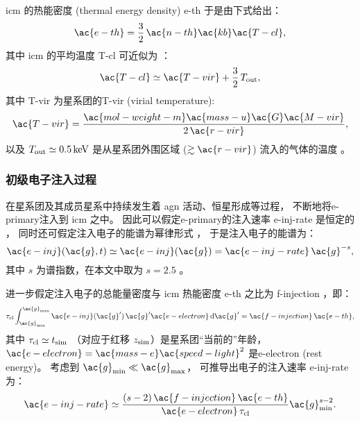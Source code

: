 \ac{icm} 的热能密度 (thermal energy density) \ac{e-th} 于是由下式给出：
\begin{equation}
  \label{eq:e-th}
  \ac{e-th} = \frac{3}{2} \,\ac{n-th} \ac{kb} \ac{T-cl} ,
\end{equation}
其中 \ac{icm} 的平均温度 \ac{T-cl} 可近似为 \cite{cavaliere1998}：
\begin{equation}
  \label{eq:t-icm}
  \ac{T-cl} \simeq \ac{T-vir} + \frac{3}{2} \,T_{\R{out}} ,
\end{equation}
其中 \ac{T-vir} 为星系团的\acl{T-vir} (virial temperature):
\begin{equation}
  \ac{T-vir} =
    \frac{\ac{mol-weight-m} \ac{mass-u} \ac{G} \ac{M-vir}}{2\,\ac{r-vir}} ,
\end{equation}
以及 $T_{\R{out}} \simeq \SI{0.5}{\keV}$
是从星系团外围区域 ($\gtrsim \ac{r-vir}$) 流入的气体的温度 \cite{fujita2003}。

\subsubsection{初级电子注入过程}

在星系团及其成员星系中持续发生着 \ac{agn} 活动、恒星形成等过程，
不断地将\ac{e-primary}注入到 \ac{icm} 之中。
因此可以假定\ac{e-primary}的注入速率 \ac{e-inj-rate} 是恒定的
\cite{cassano2005,donnert2014}，
同时还可假定注入电子的能谱为幂律形式 \cite{sarazin1999}，
于是注入电子的能谱为：
\begin{equation}
  \label{eq:electron-inj}
  \ac{e-inj}(\ac{g}, t)
    \simeq \ac{e-inj}(\ac{g})
    = \ac{e-inj-rate} \,\ac{g}^{-s} ,
\end{equation}
其中 $s$ 为谱指数，在本文中取为 $s = 2.5$ \cite{cassano2005}。

进一步假定注入电子的总能量密度与 \ac{icm} 热能密度 \ac{e-th} 之比为
\ac{f-injection} \cite{cassano2005}，即：
\begin{equation}
  \tau_{\R{cl}} \int_{\ac{g}_{\R{min}}}^{\ac{g}_{\R{max}}}
  \ac{e-inj}(\ac{g}') \,\ac{g}'\ac{e-electron} \,\D{\ac{g}'}
    = \ac{f-injection} \,\ac{e-th} ,
\end{equation}
其中
$\tau_{\mathrm{cl}} \simeq t_{\mathrm{sim}}$
（对应于红移 $z_{\mathrm{sim}}$）是星系团\enquote{当前的}年龄，
$\ac{e-electron} = \ac{mass-e} \ac{speed-light}^2$
是\acl{e-electron} (rest energy)。
考虑到 $\ac{g}_{\R{min}} \ll \ac{g}_{\R{\max}}$，
可推导出电子的注入速率 \ac{e-inj-rate} 为：
\begin{equation}
  \label{eq:injrate}
  \ac{e-inj-rate} \simeq
    \frac{(s-2)\,\ac{f-injection}\,\ac{e-th}}{
      \ac{e-electron}\,\tau_{\R{cl}}} \ac{g}_{\R{min}}^{s-2} .
\end{equation}

